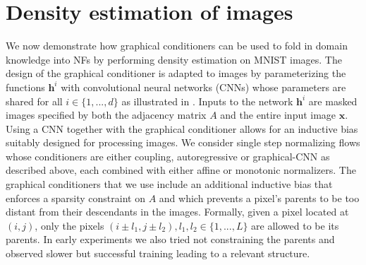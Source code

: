 \section{Density estimation of images} \label{app:MNIST}
We now demonstrate how graphical conditioners can be used to fold in domain knowledge into NFs by performing density estimation on MNIST images. The design of the graphical conditioner is adapted to images by parameterizing the functions $\mathbf{h}^i$ with convolutional neural networks (CNNs) whose parameters are shared for all $i \in \{1, ..., d\}$ as illustrated in . Inputs to the network $\mathbf{h}^i$ are masked images specified by both the adjacency matrix $A$ and the entire input image $\mathbf{x}$. %
Using a CNN together with the graphical conditioner allows for an inductive bias suitably designed for processing images. 
We consider single step normalizing flows whose conditioners are either coupling, autoregressive or graphical-CNN as described above, each combined with either affine or monotonic normalizers. %
The graphical conditioners that we use include an additional inductive bias that enforces a sparsity constraint on $A$ and which prevents a pixel's parents to be too distant from their descendants in the images. Formally, given a pixel located at $(i, j)$, only the pixels $(i \pm l_1, j \pm l_2),  l_1, l_2\in \{1, ..., L\}$ are allowed to be its parents. In early experiments we also tried not constraining the parents and observed slower but successful training leading to a relevant structure. 

